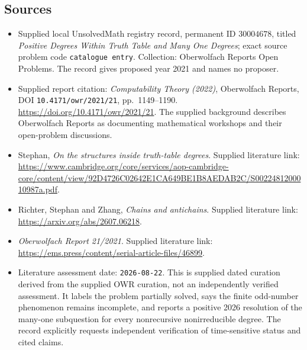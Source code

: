 \documentclass[11pt]{article}
\begin{document}
\subsection{Sources}
\begin{itemize}
\item Supplied local UnsolvedMath registry record, permanent ID \(30004678\), titled \emph{Positive Degrees Within Truth Table and Many One Degrees}; exact source problem code \texttt{catalogue entry}. Collection: Oberwolfach Reports Open Problems. The record gives proposed year 2021 and names no proposer.
\item Supplied report citation: \emph{Computability Theory (2022)}, Oberwolfach Reports, DOI \texttt{10.4171/owr/2021/21}, pp.\ 1149--1190. \url{https://doi.org/10.4171/owr/2021/21}. The supplied background describes Oberwolfach Reports as documenting mathematical workshops and their open-problem discussions.
\item Stephan, \emph{On the structures inside truth-table degrees}. Supplied literature link: \url{https://www.cambridge.org/core/services/aop-cambridge-core/content/view/92D4726C02642E1CA649BE1B8AEDAB2C/S0022481200010987a.pdf}.
\item Richter, Stephan and Zhang, \emph{Chains and antichains}. Supplied literature link: \url{https://arxiv.org/abs/2607.06218}.
\item \emph{Oberwolfach Report 21/2021}. Supplied literature link: \url{https://ems.press/content/serial-article-files/46899}.
\item Literature assessment date: \texttt{2026-08-22}. This is supplied dated curation derived from the supplied OWR curation, not an independently verified assessment. It labels the problem partially solved, says the finite odd-number phenomenon remains incomplete, and reports a positive 2026 resolution of the many-one subquestion for every nonrecursive nonirreducible degree. The record explicitly requests independent verification of time-sensitive status and cited claims.
\end{itemize}
\end{document}
